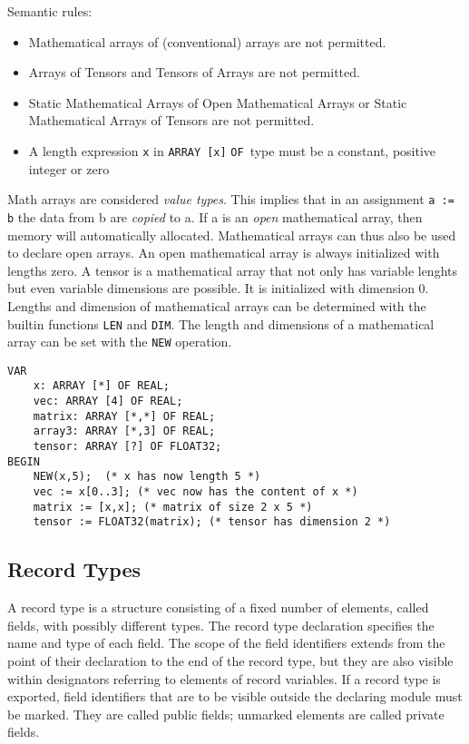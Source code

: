 \documentclass[a4wide,11pt]{article}
\newcommand{\ARRAY}{\lstinline"ARRAY"}
\newcommand{\OF}{\lstinline"OF"}
\begin{document}
Semantic rules:
\begin{itemize}
\item Mathematical arrays of (conventional) arrays are not permitted.
\item Arrays of Tensors and Tensors of Arrays are not permitted.
\item Static Mathematical Arrays of Open Mathematical Arrays or Static Mathematical Arrays of Tensors are not permitted.
\item A length expression \verb~x~ in \ARRAY\ \verb~[x]~ \OF\ type must be a constant, positive integer or zero
\end{itemize}

Math arrays are considered \emph{value types}.
This implies that in an assignment \lstinline"a := b" the data from b are \emph{copied} to a.
If a is an \emph{open} mathematical array, then memory will automatically allocated.
Mathematical arrays can thus also be used to declare open arrays.
An open mathematical array is always initialized with lengths zero.
A tensor is a mathematical array that not only has variable lenghts but even variable dimensions are possible.
It is initialized with dimension 0.
Lengths and dimension of mathematical arrays can be determined with the builtin functions \lstinline"LEN" and \lstinline"DIM".
The length and dimensions of a mathematical array can be set with the \lstinline"NEW" operation.

\begin{lstlisting}[style=example]
VAR
	x: ARRAY [*] OF REAL;
	vec: ARRAY [4] OF REAL;
	matrix: ARRAY [*,*] OF REAL;
	array3: ARRAY [*,3] OF REAL;
	tensor: ARRAY [?] OF FLOAT32;
BEGIN
	NEW(x,5);  (* x has now length 5 *)
	vec := x[0..3]; (* vec now has the content of x *)
	matrix := [x,x]; (* matrix of size 2 x 5 *)
	tensor := FLOAT32(matrix); (* tensor has dimension 2 *)
\end{lstlisting}

\subsection{Record Types}

A record type is a structure consisting of a fixed number of elements, called fields, with possibly different types.
The record type declaration specifies the name and type of each field.
The scope of the field identifiers extends from the point of their declaration to the end of the record type, but they are also visible within designators referring to elements of record variables.
If a record type is exported, field identifiers that are to be visible outside the declaring module must be marked.
They are called public fields; unmarked elements are called private fields.
\end{document}
